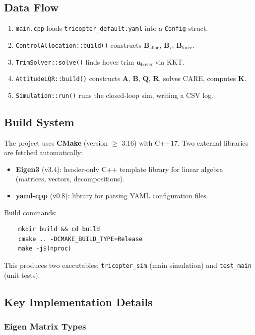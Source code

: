 \documentclass[12pt, a4paper]{article}
\newcommand{\bu}{\bm{u}}
\newcommand{\bK}{\bm{K}}
\newcommand{\bA}{\bm{A}}
\newcommand{\bB}{\bm{B}}
\newcommand{\bQ}{\bm{Q}}
\newcommand{\bR}{\bm{R}}
\begin{document}
\subsection{Data Flow}

\begin{enumerate}
    \item \texttt{main.cpp} loads \texttt{tricopter\_default.yaml} into a \texttt{Config} struct.
    \item \texttt{ControlAllocation::build()} constructs $\bB_{\text{alloc}}$, $\bB_\tau$, $\bB_{\text{force}}$.
    \item \texttt{TrimSolver::solve()} finds hover trim $\bu_{\text{hover}}$ via KKT.
    \item \texttt{AttitudeLQR::build()} constructs $\bA$, $\bB$, $\bQ$, $\bR$, solves CARE, computes $\bK$.
    \item \texttt{Simulation::run()} runs the closed-loop sim, writing a CSV log.
\end{enumerate}

\subsection{Build System}

The project uses \textbf{CMake} (version $\geq$ 3.16) with C++17.  Two external libraries are fetched automatically:
\begin{itemize}
    \item \textbf{Eigen3} (v3.4): header-only C++ template library for linear algebra (matrices, vectors, decompositions).
    \item \textbf{yaml-cpp} (v0.8): library for parsing YAML configuration files.
\end{itemize}

Build commands:
\begin{verbatim}
    mkdir build && cd build
    cmake .. -DCMAKE_BUILD_TYPE=Release
    make -j$(nproc)
\end{verbatim}

This produces two executables: \texttt{tricopter\_sim} (main simulation) and \texttt{test\_main} (unit tests).

\subsection{Key Implementation Details}

\subsubsection{Eigen Matrix Types}
\end{document}
